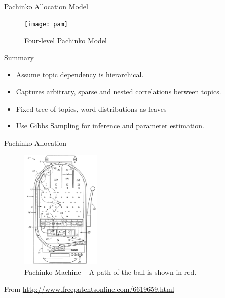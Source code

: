 \documentclass[10pt, svgnames]{beamer}
\begin{document}
\begin{frame}{Pachinko Allocation Model\cite{pachinko}}
	\begin{minipage}{.5\linewidth}
		\begin{figure}[ht]
			\begin{center}
			  \texttt{[image: pam]}
			\end{center}
			\caption{Four-level Pachinko Model}
			\label{fig:pam}
		\end{figure}
	\end{minipage}
	\begin{minipage}{.45\linewidth}
		\begin{block}{Summary}
			\begin{itemize}
				\item Assume topic dependency is hierarchical.
				\item Captures arbitrary, sparse and nested correlations between
					topics.
				\item Fixed tree of topics, word distributions as leaves
				\item Use Gibbs Sampling for inference and parameter estimation.
			\end{itemize}
		\end{block}
	\end{minipage}
\end{frame}
\begin{frame}{Pachinko Allocation}
	\begin{figure}[ht]
		\begin{center}
		  \includegraphics[height=2.25in]{pachinko}
		\end{center}
		\caption{Pachinko Machine -- A path of the ball is shown in red.}
		\label{fig:pachinko}
	\end{figure}
	\begin{center}
		\footnotesize{From
		\url{http://www.freepatentsonline.com/6619659.html}}
	\end{center}
\end{frame}
\end{document}
